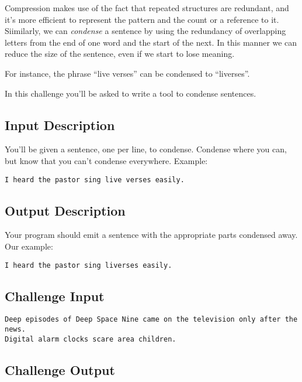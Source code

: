 Compression makes use of the fact that repeated structures are
redundant, and it's more efficient to represent the pattern and the
count or a reference to it. Siimilarly, we can \emph{condense} a
sentence by using the redundancy of overlapping letters from the end of
one word and the start of the next. In this manner we can reduce the
size of the sentence, even if we start to lose meaning.

For instance, the phrase ``live verses'' can be condensed to
``liverses''.

In this challenge you'll be asked to write a tool to condense sentences.

\subsection*{Input Description}\label{input-description-14}

You'll be given a sentence, one per line, to condense. Condense where
you can, but know that you can't condense everywhere. Example:

\begin{lstlisting}
I heard the pastor sing live verses easily.
\end{lstlisting}

\subsection*{Output Description}\label{output-description-15}

Your program should emit a sentence with the appropriate parts condensed
away. Our example:

\begin{lstlisting}
I heard the pastor sing liverses easily. 
\end{lstlisting}

\subsection*{Challenge Input}\label{challenge-input-15}

\begin{lstlisting}
Deep episodes of Deep Space Nine came on the television only after the news.
Digital alarm clocks scare area children.
\end{lstlisting}

\subsection*{Challenge Output}\label{challenge-output-12}

